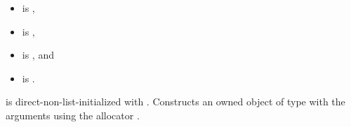 \begin{itemdescr}
\pnum
\constraints

\begin{itemize}
\item
{} is ,
\item
{} is ,
\item
{} is , and
\item
{} is .
\end{itemize}

\pnum
\effects
{} is direct-non-list-initialized with .
Constructs an owned object of type  with the arguments
using the allocator .
\end{itemdescr}
